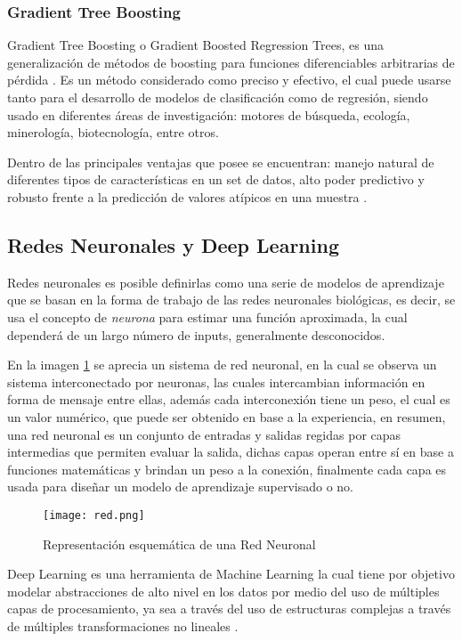 \subsubsection{Gradient Tree Boosting}

Gradient Tree Boosting o Gradient Boosted Regression Trees, es una generalización de métodos de boosting para funciones diferenciables arbitrarias de pérdida \cite{gradient}. Es un método considerado como preciso y efectivo, el cual puede usarse tanto para el desarrollo de modelos de clasificación como de regresión, siendo usado en diferentes áreas de investigación: motores de búsqueda, ecología, minerología, biotecnología, entre otros.

Dentro de las principales ventajas que posee se encuentran: manejo natural de diferentes tipos de características en un set de datos, alto poder predictivo y robusto frente a la predicción de valores atípicos en una muestra \cite{FRIEDMAN2002367}.
 
\subsection{Redes Neuronales y Deep Learning}

Redes neuronales es posible definirlas como una serie de modelos de aprendizaje que se basan en la forma de trabajo de las redes neuronales biológicas, es decir, se usa el concepto de \textit{neurona} para estimar una función aproximada, la cual dependerá de un largo número de inputs, generalmente desconocidos.

En la imagen \ref{red} se aprecia un sistema de red neuronal, en la cual se observa un sistema interconectado por neuronas, las cuales intercambian información en forma de mensaje entre ellas, además cada interconexión tiene un peso, el cual es un valor numérico, que puede ser obtenido en base a la experiencia, en resumen, una red neuronal es un conjunto de entradas y salidas regidas por capas intermedias que permiten evaluar la salida, dichas capas operan entre sí en base a funciones matemáticas y brindan un peso a la conexión, finalmente cada capa es usada para diseñar un modelo de aprendizaje supervisado o no.

\begin{figure}[!h]
	\centering
	\texttt{[image: red.png]}
	\caption{Representación esquemática de una Red Neuronal}
	\label{red}
\end{figure} 

Deep Learning es una herramienta de Machine Learning la cual tiene por objetivo modelar abstracciones de alto nivel en los datos por medio del uso de múltiples capas de procesamiento, ya sea a través del uso de estructuras complejas a través de múltiples transformaciones no lineales \cite{bengio2013representation, MAL-006, SIG-039}. 

